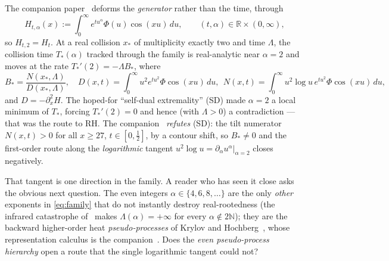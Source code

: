\documentclass[11pt,reqno]{amsart}
\theoremstyle{plain}
\theoremstyle{definition}
\theoremstyle{remark}
\newcommand{\R}{\mathbb R}
\newcommand{\N}{\mathbb N}
\begin{document}
The companion paper~\cite{Fsymbol} deforms the \emph{generator} rather than
the time, through
\begin{equation}\label{eq:family}
  H_{t,\alpha}(x):=\int_0^\infty e^{tu^\alpha}\Phi(u)\cos(xu)\,du,
  \qquad (t,\alpha)\in\R\times(0,\infty),
\end{equation}
so $H_{t,2}=H_t$. At a real collision $x_*$ of multiplicity exactly two and
time $\Lambda$, the collision time $T_*(\alpha)$ tracked through the family
is real-analytic near $\alpha=2$ and moves at the rate $T_*'(2)=-\Lambda
B_*$, where
\begin{equation}\label{eq:Bstar}
  B_*=\frac{N(x_*,\Lambda)}{D(x_*,\Lambda)},\quad
  D(x,t)=\!\int_0^\infty\! u^2e^{tu^2}\Phi\cos(xu)\,du,\ \
  N(x,t)=\!\int_0^\infty\! u^2\log u\,e^{tu^2}\Phi\cos(xu)\,du,
\end{equation}
and $D=-\partial_x^2H$. The hoped-for ``self-dual extremality'' (SD) made
$\alpha=2$ a local minimum of $T_*$, forcing $T_*'(2)=0$ and hence (with
$\Lambda>0$) a contradiction --- that was the route to RH. The
companion~\cite{Fsymbol} \emph{refutes} (SD): the tilt numerator
$N(x,t)>0$ for all $x\ge27$, $t\in[0,\tfrac12]$, by a contour shift, so
$B_*\neq0$ and the first-order route along the \emph{logarithmic} tangent
$u^2\log u=\partial_\alpha u^\alpha|_{\alpha=2}$ closes negatively.

That tangent is one direction in the family. A reader who has seen it close
asks the obvious next question. The even integers $\alpha\in\{4,6,8,\dots\}$
are the only \emph{other} exponents in \eqref{eq:family} that do not
instantly destroy real-rootedness (the infrared catastrophe
of~\cite{Fsymbol} makes $\Lambda(\alpha)=+\infty$ for every
$\alpha\notin2\N$); they are the backward higher-order heat
\emph{pseudo-processes} of Krylov and Hochberg~\cite{Krylov,Hochberg},
whose representation calculus is the companion~\cite{Fpseudo}. Does the
\emph{even pseudo-process hierarchy} open a route that the single
logarithmic tangent could not?
\end{document}
